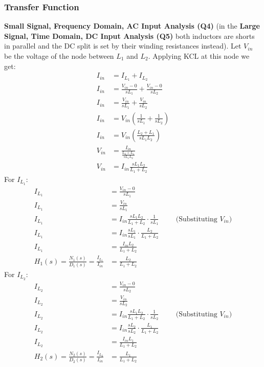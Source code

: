 \subsubsection{Transfer Function}
\textbf{Small Signal, Frequency Domain, AC Input Analysis (Q4)} (in the
\textbf{Large Signal, Time Domain, DC Input Analysis (Q5)} both inductors
are shorts in parallel and the DC split is set by their winding
resistances instead). Let \(V_{in}\) be the voltage of the node between
\(L_1\) and \(L_2\). Applying KCL at this node we get:
\begin{align*}
  I_{in} &= I_{L_1} + I_{L_2} \\
  I_{in} &= \frac{V_{in} - 0}{sL_1} + \frac{V_{in} - 0}{sL_2} \\
  I_{in} &= \frac{V_{in}}{sL_1} + \frac{V_{in}}{sL_2} \\
  I_{in} &= V_{in}\left(\frac{1}{sL_1} + \frac{1}{sL_2}\right) \\
  I_{in} &= V_{in}\left(\frac{L_2 + L_1}{sL_1 L_2}\right) \\
  V_{in} &= \frac{I_{in}}{\frac{L_2 + L_1}{sL_1 L_2}} \\
  V_{in} &= I_{in}\frac{sL_1 L_2}{L_1 + L_2}
\end{align*}
For \(I_{L_1}\):
\begin{align*}
  I_{L_1} &= \frac{V_{in} - 0}{sL_1} \\
  I_{L_1} &= \frac{V_{in}}{sL_1} \\
  I_{L_1} &= I_{in}\frac{sL_1 L_2}{L_1 + L_2} \cdot \frac{1}{sL_1} \hspace{1cm} \text{(Substituting \(V_{in}\))} \\
  I_{L_1} &= I_{in}\frac{sL_1}{sL_1} \cdot \frac{L_2}{L_1 + L_2} \\
  I_{L_1} &= \frac{I_{in} L_2}{L_1 + L_2} \\
  H_1(s) = \frac{N_1(s)}{D_1(s)} = \frac{I_{L_1}}{I_{in}} &= \frac{L_2}{L_1 + L_2}
\end{align*}
For \(I_{L_2}\):
\begin{align*}
  I_{L_2} &= \frac{V_{in} - 0}{sL_2} \\
  I_{L_2} &= \frac{V_{in}}{sL_2} \\
  I_{L_2} &= I_{in}\frac{sL_1 L_2}{L_1 + L_2} \cdot \frac{1}{sL_2} \hspace{1cm} \text{(Substituting \(V_{in}\))} \\
  I_{L_2} &= I_{in}\frac{sL_2}{sL_2} \cdot \frac{L_1}{L_1 + L_2} \\
  I_{L_2} &= \frac{I_{in} L_1}{L_1 + L_2} \\
  H_2(s) = \frac{N_2(s)}{D_2(s)} = \frac{I_{L_2}}{I_{in}} &= \frac{L_1}{L_1 + L_2}
\end{align*}
